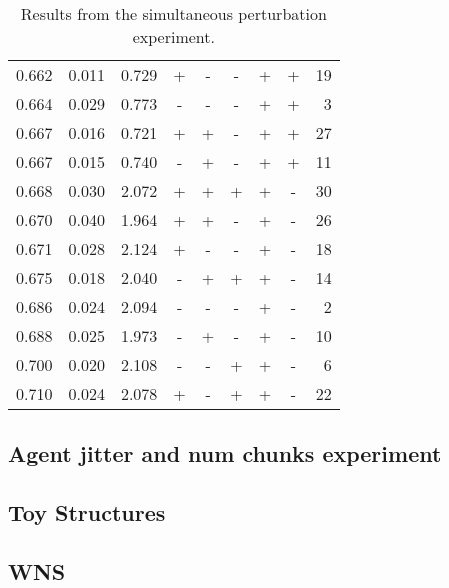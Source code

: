 \documentclass[11pt]{article}
\begin{document}
\begin{table}[ht]
\begin{tabular}{rrrcccccr}
  0.662 & 0.011 & 0.729 & + & - & - & + & + & 19 \\ 
  0.664 & 0.029 & 0.773 & - & - & - & + & + & 3 \\ 
  0.667 & 0.016 & 0.721 & + & + & - & + & + & 27 \\ 
  0.667 & 0.015 & 0.740 & - & + & - & + & + & 11 \\ 
  0.668 & 0.030 & 2.072 & + & + & + & + & - & 30 \\ 
  0.670 & 0.040 & 1.964 & + & + & - & + & - & 26 \\ 
  0.671 & 0.028 & 2.124 & + & - & - & + & - & 18 \\ 
  0.675 & 0.018 & 2.040 & - & + & + & + & - & 14 \\ 
  0.686 & 0.024 & 2.094 & - & - & - & + & - & 2 \\ 
  0.688 & 0.025 & 1.973 & - & + & - & + & - & 10 \\ 
  0.700 & 0.020 & 2.108 & - & - & + & + & - & 6 \\ 
  0.710 & 0.024 & 2.078 & + & - & + & + & - & 22 \\ 
   \hline
\end{tabular}
\caption{Results from the simultaneous perturbation experiment.} 
\end{table}




\subsection{Agent jitter and num chunks experiment}
\label{sec-5-2}

\subsection{Toy Structures}
\label{sec-5-3}

\subsection{WNS}
\label{sec-5-4}
\end{document}
